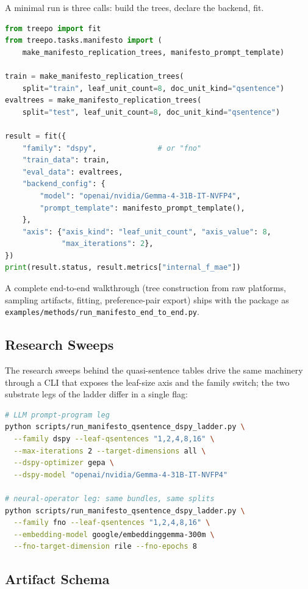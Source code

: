 A minimal run is three calls: build the trees, declare the backend,
fit.
\begin{lstlisting}[language=Python]
from treepo import fit
from treepo.tasks.manifesto import (
    make_manifesto_replication_trees, manifesto_prompt_template)

train = make_manifesto_replication_trees(
    split="train", leaf_unit_count=8, doc_unit_kind="qsentence")
evaltrees = make_manifesto_replication_trees(
    split="test", leaf_unit_count=8, doc_unit_kind="qsentence")

result = fit({
    "family": "dspy",              # or "fno"
    "train_data": train,
    "eval_data": evaltrees,
    "backend_config": {
        "model": "openai/nvidia/Gemma-4-31B-IT-NVFP4",
        "prompt_template": manifesto_prompt_template(),
    },
    "axis": {"axis_kind": "leaf_unit_count", "axis_value": 8,
             "max_iterations": 2},
})
print(result.status, result.metrics["internal_f_mae"])
\end{lstlisting}
A complete end-to-end walkthrough (tree construction from raw
platforms, sampling artifacts, fitting, preference-pair export) ships
with the package as
\texttt{examples/methods/run\_manifesto\_end\_to\_end.py}.

\subsection{Research Sweeps}

The research sweeps behind the quasi-sentence tables drive the same
machinery through a CLI that exposes the leaf-size axis and the family
switch; the two substrate legs of the ladder differ in a single flag:
\begin{lstlisting}[language=bash]
# LLM prompt-program leg
python scripts/run_manifesto_qsentence_dspy_ladder.py \
  --family dspy --leaf-qsentences "1,2,4,8,16" \
  --max-iterations 2 --target-dimensions all \
  --dspy-optimizer gepa \
  --dspy-model "openai/nvidia/Gemma-4-31B-IT-NVFP4"

# neural-operator leg: same bundles, same splits
python scripts/run_manifesto_qsentence_dspy_ladder.py \
  --family fno --leaf-qsentences "1,2,4,8,16" \
  --embedding-model google/embeddinggemma-300m \
  --fno-target-dimension rile --fno-epochs 8
\end{lstlisting}

\subsection{Artifact Schema}

